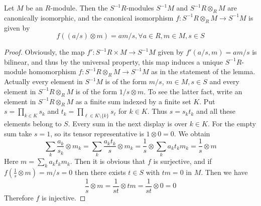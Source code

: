 \begin{lemma}
\label{lemma-tensor-localization}
Let $M$ be an $R$-module. Then the $S^{-1}R$-modules $S^{-1}M$
and $S^{-1}R \otimes_R M$ are canonically isomorphic, and the
canonical isomorphism $f : S^{-1}R \otimes_R M \to S^{-1}M$
is given by
$$
f((a/s) \otimes m) = am/s, \forall a \in R, m \in M, s \in S
$$
\end{lemma}

\begin{proof}
Obviously, the map
$f' : S^{-1}R \times M \to S^{-1}M$ given by $f'(a/s, m) = am/s$ is
bilinear, and thus by the
universal property, this map induces a unique $S^{-1}R$-module homomorphism
$f : S^{-1}R \otimes_R M \to S^{-1}M$ as in the statement of the lemma.
Actually every element in $S^{-1}M$ is of the form $m/s$, $m\in M, s\in S$ and
every element in
$S^{-1}R \otimes_R M$ is of the form $1/s \otimes m$. To see the latter fact,
write an element in $S^{-1}R\otimes_R M$ as a finite sum
indexed by a finite set $K$. Put
$s = \prod_{k\in K}s_k$ and
$t_k = \prod_{\ell\in K\setminus\{k\}}s_\ell$ for $k\in K$.
Thus $s=s_kt_k$ and all these elements belong to $S$.
Every sum in the next display is over $k\in K$.
For the empty sum take $s=1$, so its tensor representative is
$1\otimes 0=0$. We obtain
$$
\sum_k \frac{a_k}{s_k} \otimes m_k =
\sum_k \frac{a_k t_k}{s} \otimes m_k =
\frac{1}{s} \otimes \sum_k {a_k t_k}m_k = \frac{1}{s} \otimes m
$$
Here $m = \sum_k {a_k t_k}m_k$. Then it is obvious that $f$ is surjective,
and if $f(\frac{1}{s} \otimes m) = m/s = 0$ then there exists $t \in S$ with
$tm = 0$ in $M$. Then we have
$$
\frac{1}{s} \otimes m = \frac{1}{st} \otimes tm = \frac{1}{st} \otimes 0 = 0
$$
Therefore $f$ is injective.
\end{proof}